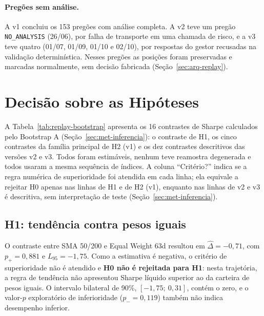 \paragraph*{Pregões sem análise.} A v1 concluiu os 153 pregões com análise completa. A v2 teve um pregão \texttt{NO\_ANALYSIS} (26/06), por falha de transporte em uma chamada de risco, e a v3 teve quatro (01/07, 01/09, 01/10 e 02/10), por respostas do gestor recusadas na validação determinística. Nesses pregões as posições foram preservadas e marcadas normalmente, sem decisão fabricada (Seção~\ref{sec:arq-replay}).

\section{Decisão sobre as Hipóteses}
\label{sec:res-hipoteses}

A Tabela~\ref{tab:replay-bootstrap} apresenta os 16 contrastes de Sharpe calculados pelo Bootstrap A (Seção~\ref{sec:met-inferencia}): o contraste de H1, os cinco contrastes da família principal de H2 (v1) e os dez contrastes descritivos das versões v2 e v3. Todos foram estimáveis, nenhum teve reamostra degenerada e todos usaram a mesma sequência de índices. A coluna ``Critério?'' indica se a regra numérica de superioridade foi atendida em cada linha; ela equivale a rejeitar H0 apenas nas linhas de H1 e de H2 (v1), enquanto nas linhas de v2 e v3 é descritiva, sem interpretação de teste (Seção~\ref{sec:met-inferencia}).


\subsection{H1: tendência contra pesos iguais}
\label{sec:res-h1}

O contraste entre SMA 50/200 e Equal Weight 63d resultou em $\hat{\Delta} = -0{,}71$, com $p_{+} = 0{,}881$ e $L_{95} = -1{,}75$. Como a estimativa é negativa, o critério de superioridade não é atendido e \textbf{H0 não é rejeitada para H1}: nesta trajetória, a regra de tendência não apresentou Sharpe líquido superior ao da carteira de pesos iguais. O intervalo bilateral de 90\%, $[-1{,}75;\ 0{,}31]$, contém o zero, e o valor-$p$ exploratório de inferioridade ($p_{-} = 0{,}119$) também não indica desempenho inferior.

